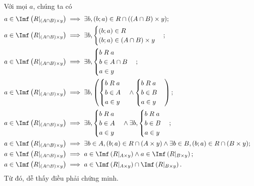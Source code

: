 \stepSubexercise Với mọi $a$, chúng ta có \begin{align*}
   a \in \Imf\left(R|_{(A \cap B) \times y}\right) &\implies \exists b, (b; a) \in R \cap ((A \cap B) \times y); \\
   a \in \Imf\left(R|_{(A \cap B) \times y}\right) &\implies \exists b, \begin{cases}
      (b; a) \in R \\
      (b; a) \in (A \cap B) \times y
   \end{cases}; \\
   a \in \Imf\left(R|_{(A \cap B) \times y}\right) &\implies \exists b, \begin{cases}
      b\;R\;a \\
      b \in A \cap B \\
      a \in y
   \end{cases}; \\
   a \in \Imf\left(R|_{(A \cap B) \times y}\right) &\implies \exists b, \left(\begin{cases}
      b\;R\;a \\
      b \in A \\
      a \in y
   \end{cases} \land \begin{cases}
      b\;R\;a \\
      b \in B \\ 
      a \in y
   \end{cases}\right); \\
   a \in \Imf\left(R|_{(A \cap B) \times y}\right) &\implies \exists b, \begin{cases}
      b\;R\;a \\
      b \in A \\
      a \in y
   \end{cases} \land \exists b, \begin{cases}
      b\;R\;a \\
      b \in B \\ 
      a \in y
   \end{cases}; \\
   a \in \Imf\left(R|_{(A \cap B) \times y}\right) &\implies \exists b \in A, (b; a) \in R \cap (A \times y) \land \exists b \in B, (b; a) \in R \cap (B \times y); \\
   a \in \Imf\left(R|_{(A \cap B) \times y}\right) &\implies a \in \Imf\left(R|_{A \times y}\right) \land a \in \Imf\left(R|_{B \times y}\right); \\
   a \in \Imf\left(R|_{(A \cap B) \times y}\right) &\implies a \in \Imf\left(R|_{A \times y}\right) \cap \Imf\left(R|_{B \times y}\right).
\end{align*}
Từ đó, dễ thấy điều phải chứng minh.


